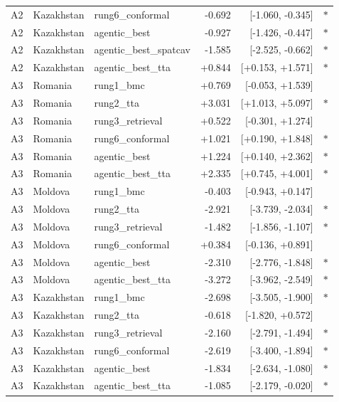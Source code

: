\begin{table}[t]
\begin{tabular}{l l l r r c}
A2 & Kazakhstan & rung6\_conformal & -0.692 & [-1.060, -0.345] & $\ast$ \\
A2 & Kazakhstan & agentic\_best & -0.927 & [-1.426, -0.447] & $\ast$ \\
A2 & Kazakhstan & agentic\_best\_spatcav & -1.585 & [-2.525, -0.662] & $\ast$ \\
A2 & Kazakhstan & agentic\_best\_tta & +0.844 & [+0.153, +1.571] & $\ast$ \\
\midrule
A3 & Romania & rung1\_bmc & +0.769 & [-0.053, +1.539] &  \\
A3 & Romania & rung2\_tta & +3.031 & [+1.013, +5.097] & $\ast$ \\
A3 & Romania & rung3\_retrieval & +0.522 & [-0.301, +1.274] &  \\
A3 & Romania & rung6\_conformal & +1.021 & [+0.190, +1.848] & $\ast$ \\
A3 & Romania & agentic\_best & +1.224 & [+0.140, +2.362] & $\ast$ \\
A3 & Romania & agentic\_best\_tta & +2.335 & [+0.745, +4.001] & $\ast$ \\
A3 & Moldova & rung1\_bmc & -0.403 & [-0.943, +0.147] &  \\
A3 & Moldova & rung2\_tta & -2.921 & [-3.739, -2.034] & $\ast$ \\
A3 & Moldova & rung3\_retrieval & -1.482 & [-1.856, -1.107] & $\ast$ \\
A3 & Moldova & rung6\_conformal & +0.384 & [-0.136, +0.891] &  \\
A3 & Moldova & agentic\_best & -2.310 & [-2.776, -1.848] & $\ast$ \\
A3 & Moldova & agentic\_best\_tta & -3.272 & [-3.962, -2.549] & $\ast$ \\
A3 & Kazakhstan & rung1\_bmc & -2.698 & [-3.505, -1.900] & $\ast$ \\
A3 & Kazakhstan & rung2\_tta & -0.618 & [-1.820, +0.572] &  \\
A3 & Kazakhstan & rung3\_retrieval & -2.160 & [-2.791, -1.494] & $\ast$ \\
A3 & Kazakhstan & rung6\_conformal & -2.619 & [-3.400, -1.894] & $\ast$ \\
A3 & Kazakhstan & agentic\_best & -1.834 & [-2.634, -1.080] & $\ast$ \\
A3 & Kazakhstan & agentic\_best\_tta & -1.085 & [-2.179, -0.020] & $\ast$ \\
\midrule
\bottomrule
\end{tabular}
\end{table}